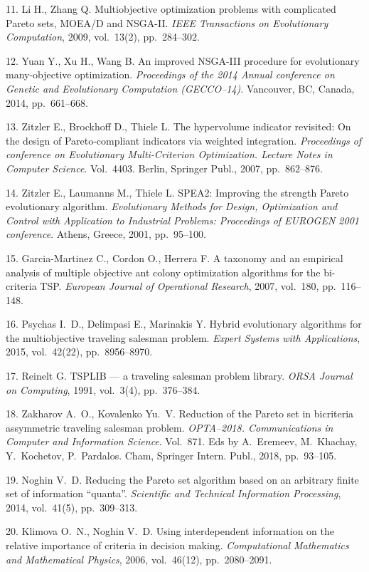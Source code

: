 {11. Li H., Zhang Q. Multiobjective optimization problems with
complicated Pareto
  sets, MOEA/D and NSGA-II. \textit{IEEE Transactions on Evolutionary Computation},
  2009, vol.~13(2), pp.~284--302.

12. Yuan Y., Xu H., Wang B. An improved NSGA-III procedure for
evolutionary
  many-objective optimization. \textit{Proceedings of the 2014 Annual conference on
  Genetic and Evolutionary Computation (GECCO--14)}. Vancouver, BC, Canada, 2014, pp.~661--668.

13. Zitzler E., Brockhoff D., Thiele L. The hypervolume indicator
revisited: On
  the design of Pareto-compliant indicators via weighted integration.
  \textit{Proceedings of conference on Evolutionary Multi-Criterion
  Optimization.
  Lecture Notes in Computer Science}. Vol.~4403.
  Berlin, Springer Publ., 2007, pp.~862--876.

14. Zitzler E., Laumanns M., Thiele L. SPEA2: Improving the
strength
  Pareto evolutionary algorithm. \textit{Evolutionary Methods
  for Design, Optimization and Control with Application to Industrial Problems:
  Proceedings of EUROGEN 2001 conference}.
  Athens, Greece, 2001, pp.~95--100.

15. Garcia-Martinez C., Cordon O., Herrera F. A taxonomy and an
empirical
  analysis of multiple objective ant colony optimization algorithms for the
  bi-criteria TSP. \textit{European Journal of Operational Research}, 2007, vol.~180,
  pp.~116--148.

16. Psychas I.~D., Delimpasi E., Marinakis Y. Hybrid evolutionary
algorithms for
  the multiobjective traveling salesman problem. \textit{Expert Systems with
  Applications}, 2015, vol.~42(22), pp.~8956--8970.

17. Reinelt G. TSPLIB --- a traveling salesman problem library.
\textit{ORSA Journal on
  Computing}, 1991, vol.~3(4), pp.~376--384.

18. Zakharov A.~O., Kovalenko Yu.~V. Reduction of the Pareto set
in bicriteria
  assymmetric traveling salesman problem.
  \textit{OPTA--2018. Communications in Computer and Information Science}. Vol.~871.
  Eds by A.~Eremeev, M.~Khachay, Y.~Kochetov, P.~Pardalos.
  Cham, Springer Intern. Publ., 2018, pp.~93--105.

19. Noghin V.~D. Reducing the Pareto set algorithm based on an
arbitrary finite
  set of information ``quanta''. \textit{Scientific and Technical Information Processing},
  2014, vol.~41(5), pp.~309--313.

20. Klimova O.~N., Noghin V.~D. Using interdependent information
on the relative
  importance of criteria in decision making. \textit{Computational Mathematics and Mathematical Physics},
  2006, vol.~46(12), pp.~2080--2091.

}

